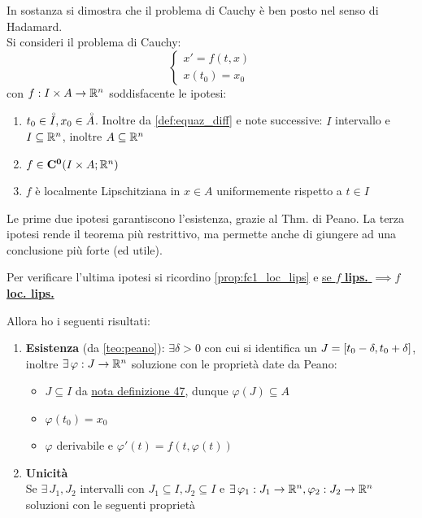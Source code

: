 \begin{theorem}
	\label{teo:cau_locale}
	In sostanza si dimostra che il problema di Cauchy è ben posto nel senso di Hadamard.\\
	Si consideri il problema di Cauchy:
	$$\begin{cases}x'=f(t,x)\\x(t_0)=x_0\end{cases}$$
	con $f:I\times A \to \mathbb{R}^n$ soddisfacente le ipotesi:
	\begin{enumerate}
		\item $t_0\in \accentset{\circ}{I}, x_0\in \accentset{\circ}{A}$. Inoltre da \ref{def:equaz_diff} e note successive: $I$ intervallo e $I\subseteq \mathbb{R}^n$, inoltre $A\subseteq \mathbb{R}^n$
		\item $f\in \mathbf{C^{0}}(I\times A; \mathbb{R}^n)$ 
		\item $f$ è localmente Lipschitziana in $x\in A$ uniformemente rispetto a $t\in I$
	\end{enumerate}
	\begin{note}
		Le prime due ipotesi garantiscono l'esistenza, grazie al Thm. di Peano. La terza ipotesi rende il teorema più restrittivo, ma permette anche di giungere ad una conclusione più forte (ed utile).
	\end{note}
	\begin{note}
		Per verificare l'ultima ipotesi si ricordino \ref{prop:fc1_loc_lips} e \hyperlink{note:if_lips_then_loclips}{se $f$ \textbf{lips.} $\implies f$ \textbf{loc. lips.}}
	\end{note}
	Allora ho i seguenti risultati:
	\begin{enumerate}
		\item \textbf{Esistenza} (da \ref{teo:peano}): $\exists \delta>0$ con cui si identifica un $J=\left[t_0-\delta,t_0+\delta\right]$, inoltre $\exists\,\varphi : J \to \mathbb{R}^n$ soluzione con le proprietà date da Peano:
		\begin{itemize}
			\item $J\subseteq I$ da \hyperlink{note:diff_eq_sol_definit_set}{nota definizione 47}, dunque $\varphi(J)\subseteq A$
			\item $\varphi(t_0)=x_0$
			\item $\varphi$ derivabile e $\varphi'(t)=f(t,\varphi(t))$
		\end{itemize}
		\item \textbf{Unicità}\\
		Se $\exists\,J_1,J_2$ intervalli con $J_1\subseteq I,J_2\subseteq I$ e $\exists\,\varphi_1:J_1\to \mathbb{R}^n, \varphi_2:J_2\to \mathbb{R}^n$ soluzioni con le seguenti proprietà

\end{enumerate}
\end{theorem}
